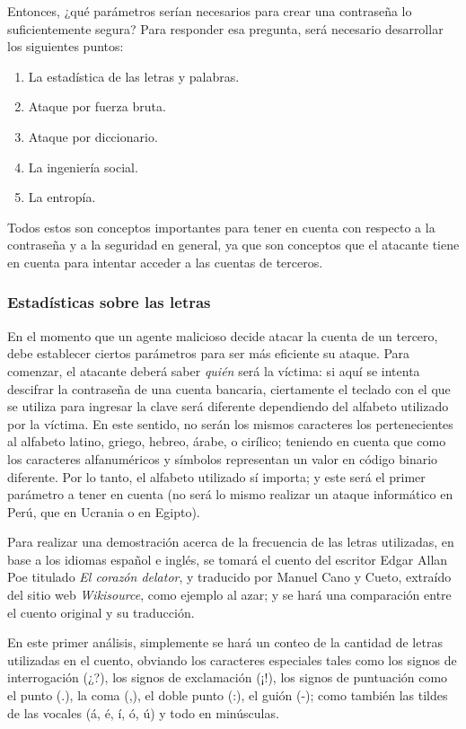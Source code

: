 \documentclass[12pt,a4paper,twoside]{book}
\begin{document}
Entonces, ¿qué parámetros serían necesarios para crear una contraseña lo suficientemente segura? Para responder esa pregunta, será necesario desarrollar los siguientes puntos:

\begin{enumerate}
\item La estadística de las letras y palabras.
\item Ataque por fuerza bruta.
\item Ataque por diccionario.
\item La ingeniería social.
\item La entropía.
\end{enumerate}

Todos estos son conceptos importantes para tener en cuenta con respecto a la contraseña y a la seguridad en general, ya que son conceptos que el atacante tiene en cuenta para intentar acceder a las cuentas de terceros.

\subsubsection{Estadísticas sobre las letras}
En el momento que un agente malicioso decide atacar la cuenta de un tercero, debe establecer ciertos parámetros para ser más eficiente su ataque. Para comenzar, el atacante deberá saber \textit{quién} será la víctima: si aquí se intenta descifrar la contraseña de una cuenta bancaria, ciertamente el teclado con el que se utiliza para ingresar la clave será diferente dependiendo del alfabeto utilizado por la víctima. En este sentido, no serán los mismos caracteres los pertenecientes al alfabeto latino, griego, hebreo, árabe, o cirílico; teniendo en cuenta que como los caracteres alfanuméricos y símbolos representan un valor en código binario diferente. Por lo tanto, el alfabeto utilizado sí importa; y este será el primer parámetro a tener en cuenta (no será lo mismo realizar un ataque informático en Perú, que en Ucrania o en Egipto).

Para realizar una demostración acerca de la frecuencia de las letras utilizadas, en base a los idiomas español e inglés, se tomará el cuento del escritor Edgar Allan Poe titulado \textit{El corazón delator}, y traducido por Manuel Cano y Cueto, extraído del sitio web \textit{Wikisource}, como ejemplo al azar; y se hará una comparación entre el cuento original y su traducción.

En este primer análisis, simplemente se hará un conteo de la cantidad de letras utilizadas en el cuento, obviando los caracteres especiales tales como los signos de interrogación (¿?), los signos de exclamación (¡!), los signos de puntuación como el punto (.), la coma (,), el doble punto (:), el guión (-); como también las tildes de las vocales (á, é, í, ó, ú) y todo en minúsculas.
\end{document}
